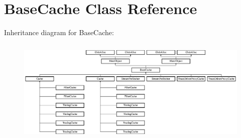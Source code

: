 \hypertarget{classBaseCache}{\section{Base\-Cache Class Reference}
\label{classBaseCache}
}
Inheritance diagram for Base\-Cache\-:\begin{figure}[H]
\begin{center}
\leavevmode
\includegraphics[height=5.031446cm]{classBaseCache}
\end{center}
\end{figure}
